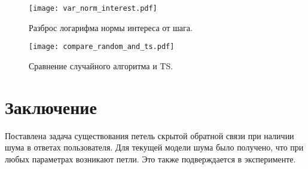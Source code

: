 \documentclass[12pt, twoside]{article}
\begin{document}
\begin{figure}[h]
  \begin{multicols}{2}
    \hfill
    \texttt{[image: var\_norm\_interest.pdf]}
    \hfill
    \caption{Разброс логарифма нормы интереса от шага.}
    \label{fig3}
    \hfill
    \texttt{[image: compare\_random\_and\_ts.pdf]}
    \hfill
    \caption{Сравнение случайного алгоритма и TS.}
    \label{fig4}
  \end{multicols}
\end{figure}




\newpage

\section{Заключение}
Поставлена задача существования петель скрытой обратной связи при наличии шума в ответах пользователя. 
Для текущей модели шума было получено, что при любых параметрах возникают петли. 
Это также подверждается в эксперименте.
\end{document}
